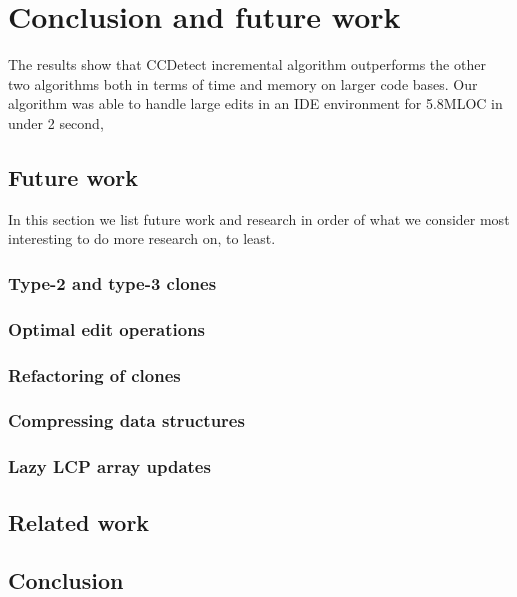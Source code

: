 \chapter{Conclusion and future work}

The results show that CCDetect incremental algorithm outperforms the other two algorithms
both in terms of time and memory on larger code bases. Our algorithm was able to handle
large edits in an IDE environment for 5.8MLOC in under 2 second,

\section{Future work}

In this section we list future work and research in order of what we consider
most interesting to do more research on, to least.

\subsection*{Type-2 and type-3 clones}

\subsection*{Optimal edit operations}

\subsection*{Refactoring of clones}

\subsection*{Compressing data structures}

\subsection*{Lazy LCP array updates}

\section{Related work}


\section{Conclusion}
